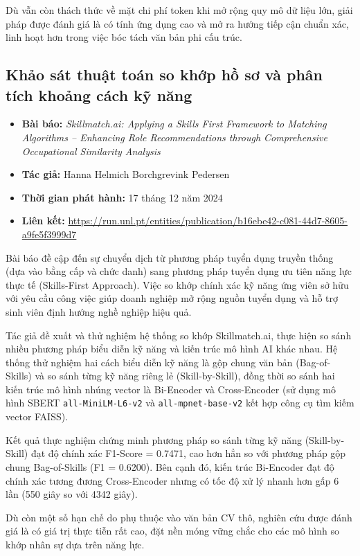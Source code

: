 Dù vẫn còn thách thức về mặt chi phí token khi mở rộng quy mô dữ liệu lớn, giải pháp được đánh giá là có tính ứng dụng cao và mở ra hướng tiếp cận chuẩn xác, linh hoạt hơn trong việc bóc tách văn bản phi cấu trúc.

\subsection{Khảo sát thuật toán so khớp hồ sơ và phân tích khoảng cách kỹ năng}
\begin{itemize}
    \item \textbf{Bài báo:} \textit{Skillmatch.ai: Applying a Skills First Framework to Matching Algorithms – Enhancing Role Recommendations through Comprehensive Occupational Similarity Analysis}
    \item \textbf{Tác giả:} Hanna Helmich Borchgrevink Pedersen
    \item \textbf{Thời gian phát hành:} 17 tháng 12 năm 2024
    \item \textbf{Liên kết:} \url{https://run.unl.pt/entities/publication/b16ebe42-c081-44d7-8605-a9fe5f3999d7}
\end{itemize}

Bài báo đề cập đến sự chuyển dịch từ phương pháp tuyển dụng truyền thống (dựa vào bằng cấp và chức danh) sang phương pháp tuyển dụng ưu tiên năng lực thực tế (Skills-First Approach). Việc so khớp chính xác kỹ năng ứng viên sở hữu với yêu cầu công việc giúp doanh nghiệp mở rộng nguồn tuyển dụng và hỗ trợ sinh viên định hướng nghề nghiệp hiệu quả.

Tác giả đề xuất và thử nghiệm hệ thống so khớp Skillmatch.ai, thực hiện so sánh nhiều phương pháp biểu diễn kỹ năng và kiến trúc mô hình AI khác nhau. Hệ thống thử nghiệm hai cách biểu diễn kỹ năng là gộp chung văn bản (Bag-of-Skills) và so sánh từng kỹ năng riêng lẻ (Skill-by-Skill), đồng thời so sánh hai kiến trúc mô hình nhúng vector là Bi-Encoder và Cross-Encoder (sử dụng mô hình SBERT \texttt{all-MiniLM-L6-v2} và \texttt{all-mpnet-base-v2} kết hợp công cụ tìm kiếm vector FAISS).

Kết quả thực nghiệm chứng minh phương pháp so sánh từng kỹ năng (Skill-by-Skill) đạt độ chính xác F1-Score = 0.7471, cao hơn hẳn so với phương pháp gộp chung Bag-of-Skills (F1 = 0.6200). Bên cạnh đó, kiến trúc Bi-Encoder đạt độ chính xác tương đương Cross-Encoder nhưng có tốc độ xử lý nhanh hơn gấp 6 lần (550 giây so với 4342 giây).

Dù còn một số hạn chế do phụ thuộc vào văn bản CV thô, nghiên cứu được đánh giá là có giá trị thực tiễn rất cao, đặt nền móng vững chắc cho các mô hình so khớp nhân sự dựa trên năng lực.

